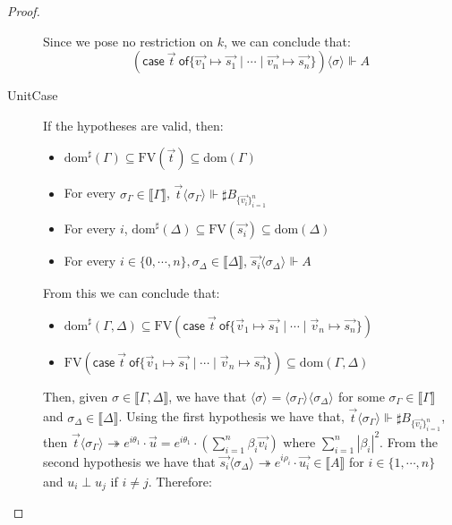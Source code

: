 \documentclass[runningheads,orivec]{llncs}
\newcommand\ansubst[2]{\ensuremath{\langle #1 \rangle_{#2}}}
\newcommand\dom[1]{\mathrm{dom}(#1)}
\newcommand\sdom[1]{\mathrm{dom}^{\sharp}(#1)}
\newcommand\FV[1]{\mathrm{FV}(#1)}
\def\gencase#1#2#3#4#5{\ensuremath{\mathsf{case}~#1~\mathsf{of} \{#2\mapsto #4 \mid \dotsb \mid #3\mapsto #5\}}}
\def\eval{\twoheadrightarrow}
\def\sem#1{\llbracket#1\rrbracket}
\def\real{\Vdash}
\newcommand\genbasis[3]{\ensuremath{B_{\{#1\}_{#2}^{#3}}}}
\begin{document}
\begin{proof}
\begin{description}
    Since we pose no restriction on $k$, we can conclude that:
    \[(\gencase{\vec{t}}{\vec{v_1}}{\vec{v_n}}{\vec{s_1}}{\vec{s_n}})\ansubst{\sigma}{}\real A\]


    \item[UnitCase] If the hypotheses are valid, then:
    \begin{itemize}
        \item $\sdom{\Gamma}\subseteq \FV{\vec{t}}\subseteq \dom{\Gamma}$
        \item For every $\sigma_\Gamma\in\sem{\Gamma}$, $\vec{t}\ansubst{\sigma_\Gamma}{}\real\sharp\genbasis{\vec{v_i}}{i=1}{n}$
        \item For every $i$, $\sdom{\Delta}\subseteq \FV{\vec{s_i}}\subseteq \dom{\Delta}$
        \item For every $i\in\{0,\dotsb ,n\}, \sigma_\Delta\in\sem{\Delta}$, $\vec{s_i}\ansubst{\sigma_\Delta}{}\real A$
    \end{itemize}
    
    From this we can conclude that:
    
    \begin{itemize}
        \item $\sdom{\Gamma,\Delta}\subseteq \FV{\gencase{\vec{t}}{\vec v_1}{\vec v_n}{\vec{s_1}}{\vec{s_n}}}$
        \item $\FV{\gencase{\vec{t}}{\vec v_1}{\vec v_n}{\vec{s_1}}{\vec{s_n}}}\subseteq \dom{\Gamma,\Delta}$
    \end{itemize}
    
    Then, given $\sigma\in\sem{\Gamma,\Delta}$, we have that $\ansubst{\sigma}{}=\ansubst{\sigma_\Gamma}{}\ansubst{\sigma_\Delta}{}$ for some $\sigma_\Gamma\in\sem{\Gamma}$ and $\sigma_\Delta\in\sem{\Delta}$. Using the first hypothesis we have that, $\vec{t}\ansubst{\sigma_\Gamma}{}\real\sharp\genbasis{\vec{v_i}}{i=1}{n}$, then $\vec{t}\ansubst{\sigma_\Gamma}{}\eval e^{i\theta_1}\cdot\vec{u}=e^{i\theta_1}\cdot(\sum_{i=1}^{n}\beta_i \vec{v_i})$ where $\sum_{i=1}^{n}|\beta_i|^2$. From the second hypothesis we have that $\vec{s_i}\ansubst{\sigma_\Delta}{}\eval e^{i\rho_i}\cdot\vec{u_i}\in\sem{A}$ for $i\in\{1,\dotsb ,n\}$ and $u_i\perp u_j$ if $i\neq j$. Therefore:


\end{description}
\end{proof}
\end{document}
